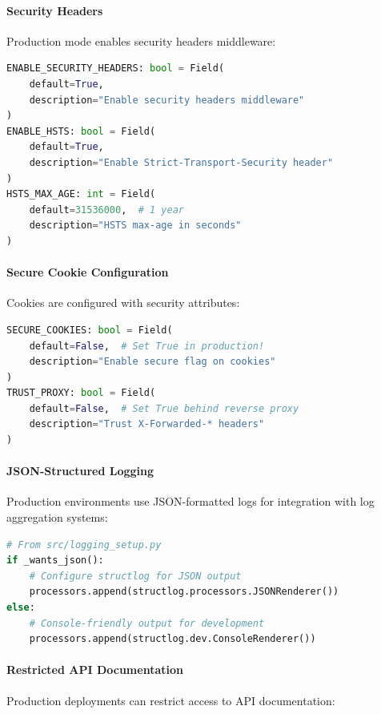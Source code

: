 \paragraph{Security Headers}
Production mode enables security headers middleware:

\begin{lstlisting}[language=Python, caption=Production security header settings]
ENABLE_SECURITY_HEADERS: bool = Field(
    default=True, 
    description="Enable security headers middleware"
)
ENABLE_HSTS: bool = Field(
    default=True, 
    description="Enable Strict-Transport-Security header"
)
HSTS_MAX_AGE: int = Field(
    default=31536000,  # 1 year
    description="HSTS max-age in seconds"
)
\end{lstlisting}

\paragraph{Secure Cookie Configuration}
Cookies are configured with security attributes:

\begin{lstlisting}[language=Python, caption=Production cookie settings]
SECURE_COOKIES: bool = Field(
    default=False,  # Set True in production!
    description="Enable secure flag on cookies"
)
TRUST_PROXY: bool = Field(
    default=False,  # Set True behind reverse proxy
    description="Trust X-Forwarded-* headers"
)
\end{lstlisting}

\paragraph{JSON-Structured Logging}
Production environments use JSON-formatted logs for integration with log aggregation systems:

\begin{lstlisting}[language=Python, caption=Production logging configuration]
# From src/logging_setup.py
if _wants_json():
    # Configure structlog for JSON output
    processors.append(structlog.processors.JSONRenderer())
else:
    # Console-friendly output for development
    processors.append(structlog.dev.ConsoleRenderer())
\end{lstlisting}

\paragraph{Restricted API Documentation}
Production deployments can restrict access to API documentation:

